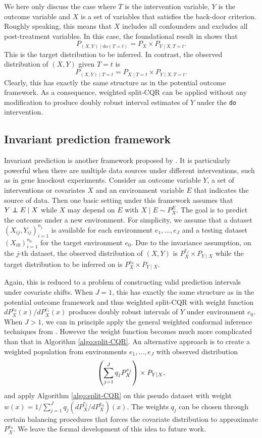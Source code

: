 We here only discuss the case where $T$ is the intervention variable,
$Y$ is the outcome variable and $X$ is a set of variables that
satisfies the back-door criterion. Roughly speaking, this means that $X$
includes all confounders and excludes all post-treatment variables. In
this case, the foundational result in \cite{pearl1995causal} shows
that
\[P_{(X, Y) \mid \mathrm{do}(T = t)} = P_{X}\times P_{Y\mid X, T = t}.\]
This is the target distribution to be inferred. In contrast, the observed distribution of $(X, Y)$ given $T = t$ is
\[P_{(X, Y)\mid T = t} = P_{X\mid T = t}\times P_{Y\mid X, T = t}.\]
Clearly, this has exactly the same structure as in the potential
outcome framework. As a consequence, weighted split-CQR can be applied
without any modification to produce doubly robust interval estimates
of $Y$ under the \texttt{do} intervention.


\subsection{Invariant prediction framework}

Invariant prediction is another framework proposed by
\cite{peters2016causal}. It is particularly powerful when there are
multiple data sources under different interventions, such as in gene
knockout experiments. Consider an outcome variable $Y$, a set of
interventions or covariates $X$ and an environment variable $E$ that
indicates the source of data. Then one basic setting under this
framework assumes that $Y\indep E \mid X$ while $X$ may depend on $E$ with
$X \mid E\sim P_{X}^{E}$. The goal is to predict the outcome under a
new environment. For simplicity, we assume that a dataset
$(X_{ij}, Y_{ij})_{i=1}^{n_{j}}$ is available for each environment
$e_{1}, \ldots, e_{J}$ and a testing dataset $(X_{i0})_{i=1}^{n_{0}}$
for the target environment $e_{0}$. Due to the invariance assumption,
on the $j$-th dataset, the observed distribution of $(X, Y)$ is
$P_{X}^{e_{j}}\times P_{Y\mid X}$ while the target distribution to be
inferred on is $P_{X}^{e_{0}}\times P_{Y\mid X}$.

Again, this is reduced to a problem of constructing valid prediction
intervals under covariate shifts. When $J = 1$, this has exactly the
same structure as in the potential outcome framework and thus weighted
split-CQR with weight function $dP_{X}^{e_{0}}(x) / dP_{X}^{e_{1}}(x)$
produces doubly robust intervals of $Y$ under environment $e_{0}$. When $J > 1$, we can in principle apply the general
weighted conformal inference techniques from
\cite{barber2019conformal}. However the weight function becomes much
more complicated than that in Algorithm \ref{algo:split-CQR}. An
alternative approach is to create a weighted population from
environments $e_{1}, \ldots, e_{J}$ with observed distribution
\[\left(\sum_{j=1}^{J}q_{j}P_{X}^{e_{j}}\right)\times P_{Y\mid X},\]
and apply Algorithm \ref{algo:split-CQR} on this pseudo dataset with weight $w(x) = 1 / \sum_{j=1}^{J}q_{j}(dP_{X}^{e_{j}} / dP_{X}^{e_{0}})(x)$. The weights $q_{j}$ can be chosen through certain balancing procedures that forces the covariate distribution to approximate $P_{X}^{e_{0}}$. We leave the formal development of this idea to future work.
